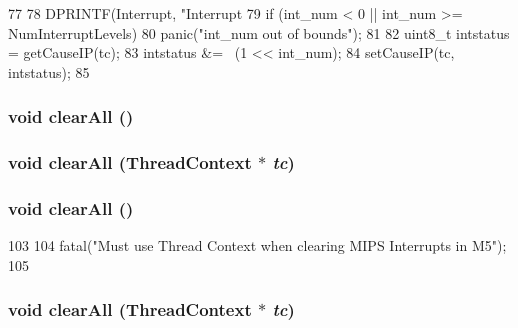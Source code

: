 \begin{DoxyCode}
77 {
78     DPRINTF(Interrupt, "Interrupt %
79     if (int_num < 0 || int_num >= NumInterruptLevels)
80         panic("int_num out of bounds\n");
81 
82     uint8_t intstatus = getCauseIP(tc);
83     intstatus &= ~(1 << int_num);
84     setCauseIP(tc, intstatus);
85 }
\end{DoxyCode}
\hypertarget{classMipsISA_1_1Interrupts_a798729dca95209ecdc609807a653a2bf}{
\subsubsection[{clearAll}]{\setlength{\rightskip}{0pt plus 5cm}void clearAll ()}}
\label{classMipsISA_1_1Interrupts_a798729dca95209ecdc609807a653a2bf}
\hypertarget{classMipsISA_1_1Interrupts_a1ff2f31dc81c8fa68f3d8abb099f3a25}{
\subsubsection[{clearAll}]{\setlength{\rightskip}{0pt plus 5cm}void clearAll ({\bf ThreadContext} $\ast$ {\em tc})}}
\label{classMipsISA_1_1Interrupts_a1ff2f31dc81c8fa68f3d8abb099f3a25}
\hypertarget{classMipsISA_1_1Interrupts_a798729dca95209ecdc609807a653a2bf}{
\subsubsection[{clearAll}]{\setlength{\rightskip}{0pt plus 5cm}void clearAll ()}}
\label{classMipsISA_1_1Interrupts_a798729dca95209ecdc609807a653a2bf}



\begin{DoxyCode}
103 {
104     fatal("Must use Thread Context when clearing MIPS Interrupts in M5");
105 }
\end{DoxyCode}
\hypertarget{classMipsISA_1_1Interrupts_a1ff2f31dc81c8fa68f3d8abb099f3a25}{
\subsubsection[{clearAll}]{\setlength{\rightskip}{0pt plus 5cm}void clearAll ({\bf ThreadContext} $\ast$ {\em tc})}}
\label{classMipsISA_1_1Interrupts_a1ff2f31dc81c8fa68f3d8abb099f3a25}



